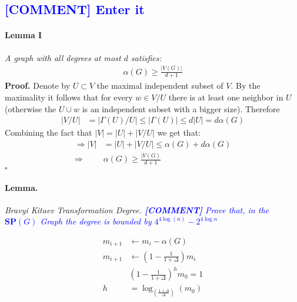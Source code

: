 \documentclass{article}
\newcommand{\commentt}[1]{\textcolor{blue}{ \textbf{[COMMENT]} #1}}
\newcommand{\ctt}[1]{\commentt{#1}}
\newcommand{\Lemma}{\paragraph{Lemma.}}
\begin{document}
\begin{multicols*}{2}
\section{\ctt{Enter it}}

\paragraph{Lemma I} \textit{ A graph with all degrees at most \(d\) satisfies: 
\begin{equation*}
    \begin{split}
        \alpha \left( G\right) \ge \frac{|V\left(G\right)|}{d+1}
    \end{split}
\end{equation*}
}
\textbf{Proof.} Denote by \(U \subset V\) the maximal independent subset of \(V\). By the maximality it follows that for every \(w \in V/U \) there is at least one neighbor in \(U\) (otherwise the \(U \cup w\) is an independent subset with a bigger size). Therefore 
\begin{equation*}
    \begin{split}
        |V/U| &= |\Gamma\left(U\right) / U | \le |\Gamma\left(U\right)| \le d |U|= d \alpha \left( G\right) 
    \end{split}
\end{equation*}
Combining the fact that \(|V| = |U| + |V/U| \) we get that: 
\begin{equation*}
    \begin{split}
        \Rightarrow |V| &= |U| + |V/U| \le \alpha \left( G\right)  + d \alpha \left( G\right) \\
        \Rightarrow \  & \alpha \left( G\right) \ge \frac{|V\left(G\right)}{d+1} 
    \end{split}
\end{equation*}
\(\square\)

\Lemma \textit{Bravyi Kitaev Transformation Degree. \ctt{Prove that, in the \(\textbf{SP}(G)\) Graph the degree is bounded by \(4^{4\log(n)} - 2^{4\log{n}}\) }}


\begin{equation*}
    \begin{split}
        m_{i+1} & \leftarrow m_{i} - \alpha\left(G\right) \\ 
        m_{i+1} & \leftarrow \left( 1  - \frac{1}{1 + \Delta} \right)m_{i} \\ 
        & \left( 1  - \frac{1}{1 + \Delta} \right)^{h} m_{0} = 1 \\
        h &= \log_{\left( \frac{1 + \Delta}{\Delta} \right)}{\left( m_{0} \right)}
    \end{split}
\end{equation*}


\end{multicols*}
\end{document}
